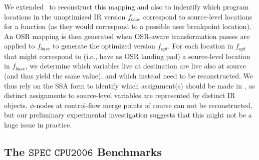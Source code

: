 \noindent We extended \tinyvm\ to reconstruct this mapping and also to indentify which program locations in the unoptimized IR version $f_{base}$ correspond to source-level locations for a function (as they would correspond to a possible user breakpoint location). An OSR mapping is then generated when OSR-aware transformation passes are applied to $f_{base}$ to generate the optimized version $f_{opt}$. For each location in $f_{opt}$ that might correspond to (i.e., have as OSR landing pad) a source-level location in $f_{base}$, we determine which variables live at destination are live also at source (and thus yield the same value), and which instead need to be reconstructed. We thus rely on the SSA form to identify which assignment(s) should be made in \reconstruct, as distinct assignments to source-level variables are represented by distinct IR objects. $\phi$-nodes at control-flow merge points of course can not be reconstructed, but our preliminary experimental investigation suggests that this might not be a huge issue in practice.

\missing %


\subsection{The \texorpdfstring{$\texttt{SPEC CPU2006}$}{SPEC CPU2006} Benchmarks}

